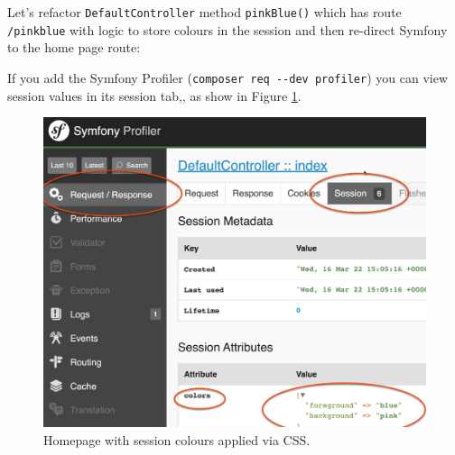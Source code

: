 \documentclass[a4paperpaper,openright]{book}
\newenvironment{Shaded}{}{}
\newcommand{\CommentTok}[1]{\textcolor[rgb]{0.38,0.63,0.69}{\textit{#1}}}
\newcommand{\KeywordTok}[1]{\textcolor[rgb]{0.00,0.44,0.13}{\textbf{#1}}}
\newcommand{\NormalTok}[1]{#1}
\newcommand{\OtherTok}[1]{\textcolor[rgb]{0.00,0.44,0.13}{#1}}
\newcommand{\StringTok}[1]{\textcolor[rgb]{0.25,0.44,0.63}{#1}}
\begin{document}
Let's refactor \texttt{DefaultController} method \texttt{pinkBlue()}
which has route \texttt{/pinkblue} with logic to store colours in the
session and then re-direct Symfony to the home page route:

\begin{Shaded}
\end{Shaded}

If you add the Symfony Profiler
(\texttt{composer\ req\ -\/-dev\ profiler}) you can view session values
in its session tab,, as show in Figure \ref{session_profiler}.

\begin{figure}
\centering
\includegraphics{./tex2pdf.-8a1528da847c818a/68d4ca78dd0a6532a759f03b45716b7d47d69b1f.png}
\caption{Homepage with session colours applied via CSS.
\label{session_profiler}}
\end{figure}
\end{document}
